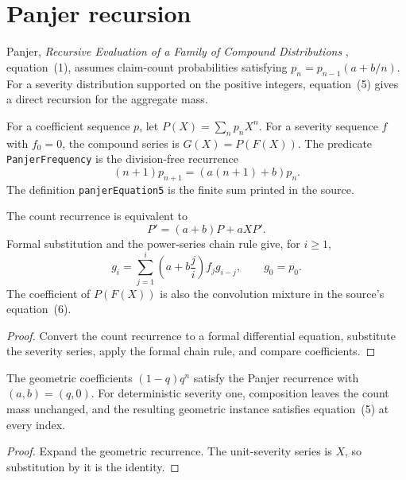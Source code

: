 \chapter{Panjer recursion}

Panjer, \emph{Recursive Evaluation of a Family of Compound Distributions}
\cite{Panjer1981}, equation~(1), assumes claim-count probabilities satisfying
$p_n=p_{n-1}(a+b/n)$. For a severity distribution supported on the positive
integers, equation~(5) gives a direct recursion for the aggregate mass.

\begin{definition}\label{def:panjer}\leanok
For a coefficient sequence $p$, let $P(X)=\sum_n p_nX^n$. For a severity
sequence $f$ with $f_0=0$, the compound series is $G(X)=P(F(X))$. The predicate
\texttt{PanjerFrequency} is the division-free recurrence
\[
  (n+1)p_{n+1}=(a(n+1)+b)p_n.
\]
The definition \texttt{panjerEquation5} is the finite sum printed in the source.
\end{definition}

\begin{theorem}\label{thm:panjer}\leanok
{}
The count recurrence is equivalent to
\[
  P'=(a+b)P+aXP'.
\]
Formal substitution and the power-series chain rule give, for $i\geq1$,
\[
  g_i=\sum_{j=1}^{i}\left(a+b\frac ji\right)f_jg_{i-j},
  \qquad g_0=p_0.
\]
The coefficient of $P(F(X))$ is also the convolution mixture in the source's
equation~(6).
\end{theorem}
\begin{proof}\leanok Convert the count recurrence to a formal differential
equation, substitute the severity series, apply the formal chain rule, and
compare coefficients. \end{proof}

\begin{theorem}\label{thm:panjer-check}\leanok
{}
The geometric coefficients $(1-q)q^n$ satisfy the Panjer recurrence with $(a,b)=(q,0)$.
For deterministic severity one, composition leaves the count mass unchanged,
and the resulting geometric instance satisfies equation~(5) at every index.
\end{theorem}
\begin{proof}\leanok Expand the geometric recurrence. The unit-severity series
is $X$, so substitution by it is the identity. \end{proof}
